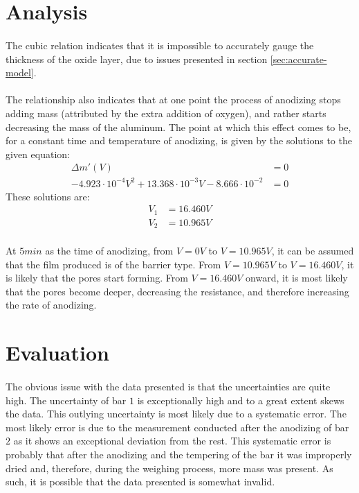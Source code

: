 \documentclass[a4paper]{article}
\begin{document}
\section{Analysis}

\paragraph*{}
The cubic relation indicates that it is impossible to accurately gauge the
thickness of the oxide layer, due to issues presented in section
\ref{sec:accurate-model}.

\paragraph*{}
The relationship also indicates that at one point the process of anodizing
stops adding mass (attributed by the extra addition of oxygen), and rather
starts decreasing the mass of the aluminum. The point at which this effect
comes to be, for a constant time and temperature of anodizing, is given by the
solutions to the given equation:
\begin{align*}
  \Delta m' (V) &= 0 \\
  -4.923 \cdot 10^{-4} V^2 + 13.368 \cdot 10^{-3} V - 8.666 \cdot 10^{-2} &= 0
\end{align*}
These solutions are:
\begin{align*}
  V_1 &= 16.460 \si{V} \\
  V_2 &= 10.965 \si{V}
\end{align*}

\paragraph*{}
At $5\si{min}$ as the time of anodizing, from $V=0\si{V}$ to $V=10.965\si{V}$,
it can be assumed that the film produced is of the barrier type. From
$V=10.965\si{V}$ to $V=16.460\si{V}$, it is likely that the pores start
forming. From $V=16.460\si{V}$ onward, it is most likely that the pores become
deeper, decreasing the resistance, and therefore increasing the rate of
anodizing.

\section{Evaluation}

\paragraph*{}
The obvious issue with the data presented is that the uncertainties are quite
high. The uncertainty of bar $1$ is exceptionally high and to a great extent
skews the data. This outlying uncertainty is most likely due to a systematic
error. The most likely error is due to the measurement conducted after the
anodizing of bar $2$ as it shows an exceptional deviation from the rest. This
systematic error is probably that after the anodizing and the tempering of the
bar it was improperly dried and, therefore, during the weighing process, more
mass was present. As such, it is possible that the data presented is somewhat
invalid.
\end{document}
